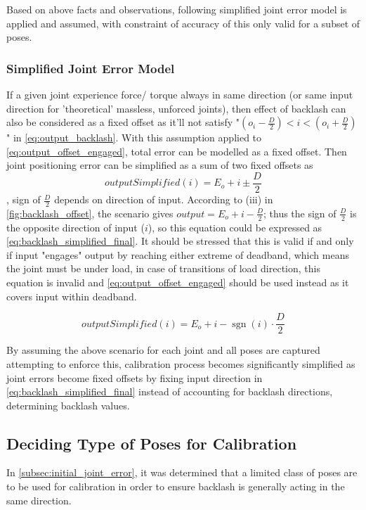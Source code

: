 \documentclass[english, printversion, nomenclature, notitle]{tuvisionthesis} %
\DeclareMathOperator{\sgn}{sgn}
\begin{document}
Based on above facts and observations, following simplified joint error model is applied and assumed, with constraint of accuracy of this only valid for a subset of poses.

\subsubsection{Simplified Joint Error Model}
\label{subsubsec:simplified_joint_error_model}
If a given joint experience force/ torque always in same direction (or same input direction for 'theoretical' massless, unforced joints), then effect of backlash can also be considered as a fixed offset as it'll not satisfy "$(o_i - \frac{D}{2}) < i < (o_i + \frac{D}{2})$" in \cref{eq:output_backlash}. With this assumption applied to \cref{eq:output_offset_engaged}, total error can be modelled as a fixed offset. Then joint positioning error can be simplified as a sum of two fixed offsets as \[outputSimplified(i) = E_o + i \pm \frac{D}{2}\], sign of $\frac{D}{2}$ depends on direction of input. According to (iii) in \cref{fig:backlash_offset}, the scenario gives $output = E_o + i - \frac{D}{2}$; thus the sign of $\frac{D}{2}$ is the opposite direction of input ($i$), so this equation could be expressed as \cref{eq:backlash_simplified_final}. It should be stressed that this is valid if and only if input "engages" output by reaching either extreme of deadband, which means the joint must be under load, in case of transitions of load direction, this equation is invalid and \cref{eq:output_offset_engaged} should be used instead as it covers input within deadband.

\begin{equation}
outputSimplified(i) = E_o + i -\sgn(i)\cdot\frac{D}{2}
\label{eq:backlash_simplified_final}
\end{equation}

By assuming the above scenario for each joint and all poses are captured attempting to enforce this, calibration process becomes significantly simplified as joint errors become fixed offsets by fixing input direction in \cref{eq:backlash_simplified_final} instead of accounting for backlash directions, determining backlash values.

\subsection{Deciding Type of Poses for Calibration}

In \cref{subsec:initial_joint_error}, it was determined that a limited class of poses are to be used for calibration in order to ensure backlash is generally acting in the same direction.
\end{document}
